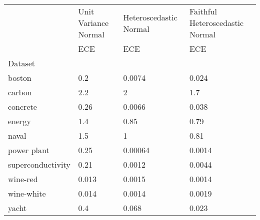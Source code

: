 \begin{tabular}{l|l|l|l}
\toprule
 & Unit Variance Normal & Heteroscedastic Normal & Faithful Heteroscedastic Normal \\
 & ECE & ECE & ECE \\
Dataset &  &  &  \\
\midrule
boston & 0.2 & 0.0074 & 0.024 \\
carbon & 2.2 & 2 & 1.7 \\
concrete & 0.26 & 0.0066 & 0.038 \\
energy & 1.4 & 0.85 & 0.79 \\
naval & 1.5 & 1 & 0.81 \\
power plant & 0.25 & 0.00064 & 0.0014 \\
superconductivity & 0.21 & 0.0012 & 0.0044 \\
wine-red & 0.013 & 0.0015 & 0.0014 \\
wine-white & 0.014 & 0.0014 & 0.0019 \\
yacht & 0.4 & 0.068 & 0.023 \\
\bottomrule
\end{tabular}
